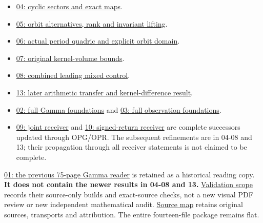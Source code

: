 \documentclass[
]{article}
\providecommand{\tightlist}{%
  \setlength{\itemsep}{0pt}\setlength{\parskip}{0pt}}
\begin{document}
\begin{itemize}
\tightlist
\item
  \href{workbenches/splitzero-tandem/continuations/20260914-original-kernel-web/04_CYCLIC_SECTORS.tex}{04:
  cyclic sectors and exact maps}.
\item
  \href{workbenches/splitzero-tandem/continuations/20260914-original-kernel-web/05_ORBIT_CONDUCTOR.tex}{05:
  orbit alternatives, rank and invariant lifting}.
\item
  \href{workbenches/splitzero-tandem/continuations/20260914-original-kernel-web/06_ACTUAL_PERIOD_QUADRIC.tex}{06:
  actual period quadric and explicit orbit domain}.
\item
  \href{workbenches/splitzero-tandem/continuations/20260914-original-kernel-web/07_ORIGINAL_KERNEL_VOLUME_BOUND.tex}{07:
  original kernel-volume bounds}.
\item
  \href{workbenches/splitzero-tandem/continuations/20260914-original-kernel-web/08_ORIGINAL_MIXED_CONTROL.tex}{08:
  combined leading mixed control}.
\item
  \href{workbenches/splitzero-tandem/continuations/20260914-original-kernel-web/13_ARITHMETIC_MIXED_TRANSFER.tex}{13:
  later arithmetic transfer and kernel-difference result}.
\item
  \href{workbenches/splitzero-tandem/continuations/20260914-original-kernel-web/02_FULL_GAMMA_PROOFS.tex}{02:
  full Gamma foundations} and
  \href{workbenches/splitzero-tandem/continuations/20260914-original-kernel-web/03_FULL_OBSERVATION_PROOFS.tex}{03:
  full observation foundations}.
\item
  \href{workbenches/splitzero-tandem/continuations/20260914-original-kernel-web/09_UPDATED_JOINT_NOTE.tex}{09:
  joint receiver} and
  \href{workbenches/splitzero-tandem/continuations/20260914-original-kernel-web/10_UPDATED_SIGNED_RETURN.tex}{10:
  signed-return receiver} are complete successors updated through
  OPG/OPR. The subsequent refinements are in 04-08 and 13; their
  propagation through all receiver statements is not claimed to be
  complete.
\end{itemize}

\href{workbenches/splitzero-tandem/continuations/20260914-original-kernel-web/01_GAMMA_READER.pdf}{01:
the previous 75-page Gamma reader} is retained as a historical reading
copy. \textbf{It does not contain the newer results in 04-08 and 13.}
\href{workbenches/splitzero-tandem/continuations/20260914-original-kernel-web/12_VALIDATION.md}{Validation
scope} records their source-only builds and exact-source checks, not a
new visual PDF review or new independent mathematical audit.
\href{workbenches/splitzero-tandem/continuations/20260914-original-kernel-web/11_SOURCE_MAP.json}{Source
map} retains original sources, transports and attribution. The entire
fourteen-file package remains flat.
\end{document}
